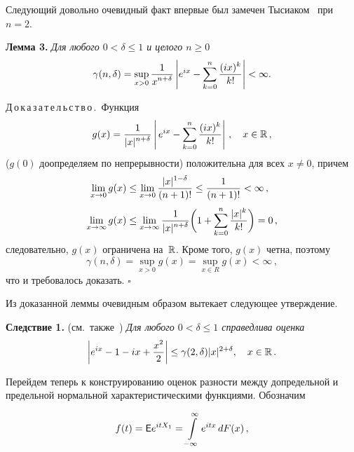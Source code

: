 \begin{multicols}{2}
\smallskip

Следующий довольно очевидный факт впервые был замечен
Тысиаком~\cite{Tysiak1983} при $n=2$.

\bigskip

\noindent
\textbf{Лемма 3.} %
\textit{Для любого $0<\delta\le1$  и целого $n\ge0$}
$$
\gamma (n,\delta)= \sup\limits_{x>0} \displaystyle\frac{\displaystyle 1\mathstrut}{\displaystyle x^{n+\delta}\mathstrut}\left\vert e^{ix}-
\sum\limits_{k=0}^n {\displaystyle\frac{\displaystyle (ix)^k\mathstrut}{\displaystyle k!\mathstrut}}\right\vert <\infty.
$$
\smallskip

\noindent
Д\,о\,к\,а\,з\,а\,т\,е\,л\,ь\,с\,т\,в\,о\,.\ Функция
$$
g(x)=\displaystyle\frac{\displaystyle 1\mathstrut}{\displaystyle |x|^{n+\delta}\mathstrut}\left|\,e^{ix}-\sum\limits_{k=0}^n
{\displaystyle\frac{\displaystyle (ix)^k\mathstrut}{\displaystyle k!\mathstrut}}\right|\,,\quad x\in\mathbb R\,,
$$
($g(0)$ доопределяем по непрерывности) 
положительна для всех $x\neq0$, причем
\begin{align*}
\lim_{x \rightarrow 0}{g(x)}&\le \lim_{x \rightarrow
0}{\displaystyle\frac{\displaystyle |x|^{1-\delta}\mathstrut}{\displaystyle (n+1)!\mathstrut}}\le \displaystyle\frac{\displaystyle 1\mathstrut}{\displaystyle (n+1)!\mathstrut}<\infty\,,\\[3pt]
\lim_{x \to \infty}{g(x)}&\le \lim_{x \to \infty}\displaystyle\frac{\displaystyle 1\mathstrut}{\displaystyle |x|^{n+\delta}\mathstrut}
\bigg(1+\sum\limits_{k=0}^n{\displaystyle\frac{\displaystyle |x|^k\mathstrut}{\displaystyle k!\mathstrut}}\bigg)=0\,,
\end{align*}
следовательно, $g(x)$ ограничена на~$\mathbb R$. Кроме того,
$g(x)$ четна, поэтому
$$
\gamma (n,\delta)=\sup\limits_{x>0}{g(x)}=\sup\limits_{x\in
R}{g(x)}<\infty\,,
$$
что и требовалось доказать. $\square$

\smallskip

Из доказанной леммы очевидным образом вытекает следующее
утверждение.

\smallskip

\noindent
\textbf{Следствие 1.} (см.\ также~\cite{Tysiak1983}) %
\textit{Для любого $0<\delta\le1$ справедлива оценка}
$$
\left|e^{ix}-1-ix+\displaystyle\frac{\displaystyle x^2\mathstrut}{\displaystyle 2\mathstrut}\right|\le \gamma(2,\delta)|x|^{2+\delta},
\quad x\in \mathbb R\,.
$$

Перейдем теперь к конструированию оценок разности между допредельной
и предельной нормальной характеристическими функциями. Обозначим

\noindent
$$
f(t)={\sf E} e^{itX_1}=\int\limits_{-\infty}^\infty e^{itx}\,dF(x)\,,
$$

\vspace*{-12pt}


\end{multicols}
